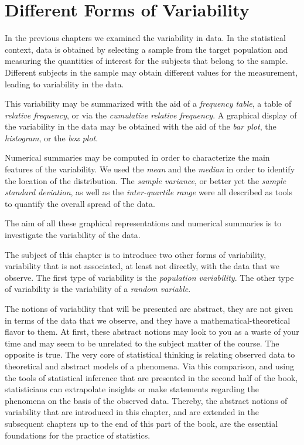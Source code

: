 \documentclass[]{krantz}
\theoremstyle{definition}
\theoremstyle{definition}
\theoremstyle{definition}
\theoremstyle{remark}
\begin{document}
\hypertarget{different-forms-of-variability}{%
\section{Different Forms of Variability}\label{different-forms-of-variability}}

In the previous chapters we examined the variability in data. In the
statistical context, data is obtained by selecting a sample from the
target population and measuring the quantities of interest for the
subjects that belong to the sample. Different subjects in the sample may
obtain different values for the measurement, leading to variability in
the data.

This variability may be summarized with the aid of a \emph{frequency table},
a table of \emph{relative frequency}, or via the \emph{cumulative relative
frequency}. A graphical display of the variability in the data may be
obtained with the aid of the \emph{bar plot}, the \emph{histogram}, or the \emph{box
plot}.

Numerical summaries may be computed in order to characterize the main
features of the variability. We used the \emph{mean} and the \emph{median} in
order to identify the location of the distribution. The \emph{sample
variance}, or better yet the \emph{sample standard deviation}, as well as the
\emph{inter-quartile range} were all described as tools to quantify the
overall spread of the data.

The aim of all these graphical representations and numerical summaries
is to investigate the variability of the data.

The subject of this chapter is to introduce two other forms of
variability, variability that is not associated, at least not directly,
with the data that we observe. The first type of variability is the
\emph{population variability}. The other type of variability is the
variability of a \emph{random variable}.

The notions of variability that will be presented are abstract, they are
not given in terms of the data that we observe, and they have a
mathematical-theoretical flavor to them. At first, these abstract
notions may look to you as a waste of your time and may seem to be
unrelated to the subject matter of the course. The opposite is true. The
very core of statistical thinking is relating observed data to
theoretical and abstract models of a phenomena. Via this comparison, and
using the tools of statistical inference that are presented in the
second half of the book, statisticians can extrapolate insights or make
statements regarding the phenomena on the basis of the observed data.
Thereby, the abstract notions of variability that are introduced in this
chapter, and are extended in the subsequent chapters up to the end of
this part of the book, are the essential foundations for the practice of
statistics.
\end{document}
